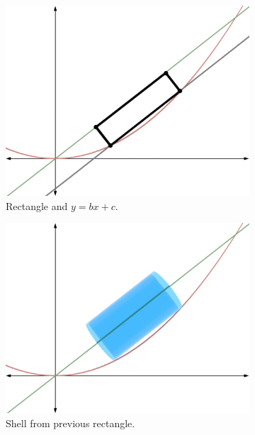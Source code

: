 \documentclass{article}
\begin{document}
\begin{figure}[h!]
  \centering
  \begin{subfigure}[b]{0.32\linewidth}
    \includegraphics[width=\linewidth]{Blender/ParabolaLineIntegration-ShellDiagram-f2_0001.png}
    \caption{Rectangle and $y=bx+c$.}
    \label{fig:shella}
  \end{subfigure}
  \begin{subfigure}[b]{0.32\linewidth}
    \includegraphics[width=\linewidth]{Blender/ParabolaLineIntegration-ShellCylinder1-f2_0001.png}
    \caption{Shell from previous rectangle.}
    \label{fig:shellb}
  \end{subfigure}
  \begin{subfigure}[b]{0.32\linewidth}

\end{subfigure}
\end{figure}
\end{document}

